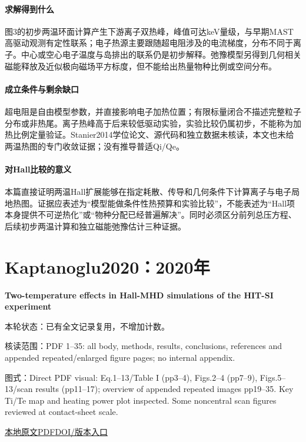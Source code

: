 \paragraph{求解得到什么}图3的初步两温环面计算产生下游离子双热峰，峰值可达keV量级，与早期MAST高驱动观测有定性联系；电子热源主要跟随超电阻涉及的电流梯度，分布不同于离子。中心或空心电子温度与岛排出的联系仍是初步解释。弛豫模型另得到几何相关磁能释放及近似极向磁场平方标度，但不能给出热量物种比例或空间分布。

\paragraph{成立条件与剩余缺口}超电阻是自由模型参数，并直接影响电子加热位置；有限标量闭合不描述完整粒子分布或非热尾。离子热峰高于后来较低驱动实验，实验比较仍属初步，不能称为加热比例定量验证。Stanier2014学位论文、源代码和独立数据未核读，本文也未给两温热图的专门收敛证据；没有推导普适Qi/Qe。

\paragraph{对Hall比较的意义}本篇直接证明两温Hall扩展能够在指定耗散、传导和几何条件下计算离子与电子局地热图。证据应表述为“模型能做条件性热预算和实验比较”，不能表述为“Hall项本身提供不可逆热化”或“物种分配已经普遍解决”。同时必须区分前列总压方程、后续初步两温计算和独立磁能弛豫估计三种证据。

\section{Kaptanoglu2020：2020年}\label{paper:Kaptanoglu2020}

\textbf{Two-temperature effects in Hall-MHD simulations of the HIT-SI experiment}\citep{Kaptanoglu2020}

\textsf{本轮状态：}已有全文记录复用，不增加计数。

\textsf{核读范围：}PDF 1–35: all body,  methods,  results,  conclusions,  references and appended repeated/enlarged figure pages;  no internal appendix.\par\textsf{图式：}Direct PDF visual: Eq.1–13/Table I (pp3–4),  Figs.2–4 (pp7–9),  Figs.5–13/scan results (pp11–17);  overview of appended repeated images pp19–35. Key Ti/Te map and heating power plot inspected. Some noncentral scan figures reviewed at contact-sheet scale.

\href{run:../../papers/Kaptanoglu2020_accepted.pdf}{本地原文PDF}\quad\href{https://doi.org/10.1063/5.0006311}{DOI/版本入口}

